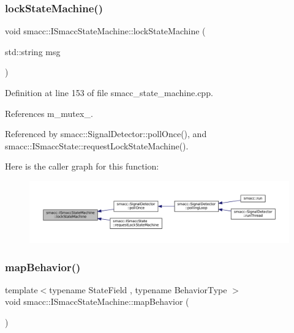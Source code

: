 \subsubsection{\texorpdfstring{lock\+State\+Machine()}{lockStateMachine()}}
{\footnotesize\ttfamily void smacc\+::\+I\+Smacc\+State\+Machine\+::lock\+State\+Machine (\begin{DoxyParamCaption}\item[{std\+::string}]{msg }\end{DoxyParamCaption})\hspace{0.3cm}{\ttfamily [private]}}



Definition at line 153 of file smacc\+\_\+state\+\_\+machine.\+cpp.



References m\+\_\+mutex\+\_\+.



Referenced by smacc\+::\+Signal\+Detector\+::poll\+Once(), and smacc\+::\+I\+Smacc\+State\+::request\+Lock\+State\+Machine().


Here is the caller graph for this function\+:
\nopagebreak
\begin{figure}[H]
\begin{center}
\leavevmode
\includegraphics[width=350pt]{classsmacc_1_1ISmaccStateMachine_a5c8d4c9a4b11c7950266a00e48080ce3_icgraph}
\end{center}
\end{figure}
\mbox{\label{classsmacc_1_1ISmaccStateMachine_acfb75233b79062cc7769ea751b7f320d}} 
\subsubsection{\texorpdfstring{map\+Behavior()}{mapBehavior()}}
{\footnotesize\ttfamily template$<$typename State\+Field , typename Behavior\+Type $>$ \\
void smacc\+::\+I\+Smacc\+State\+Machine\+::map\+Behavior (\begin{DoxyParamCaption}{ }\end{DoxyParamCaption})}



